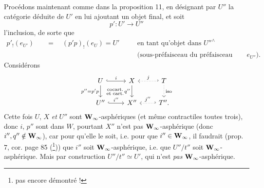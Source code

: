 Procédons maintenant comme dans la proposition 11, en désignant par $U''$ la catégorie déduite de $U'$ en lui ajoutant un objet
final, et soit
\[ p' : U' \longrightarrow U'' \]
l'inclusion, de sorte que
\[
\begin{aligned}
p'_!(e_{U'}) \quad &= \quad (p'p)_!(e_U) = U' \quad && \text{en tant qu'objet dans } U''^{\wedge}\\
& && \text{(sous-préfaisceau du préfaisceau final } e_{U''}\text{).}
\end{aligned}
\]
Considérons
\[
\begin{tikzcd}
U \arrow[r, hook, "i"] \arrow[d, "{p''=p'p}"'] \arrow[dr, phantom, "\begin{smallmatrix}\text{cocart.}\\ \text{et cart.}\end{smallmatrix}"] & X \arrow[d, "q''"'] & T \arrow[l, hook', dotted, "j"'] \arrow[d, dotted, "\text{iso}"] \\
U'' \arrow[r, hook, "i''"] & X'' & T''. \arrow[l, hook', dotted, "j''"']
\end{tikzcd}
\]
Cette fois $U$, $X$ \textit{et} $U''$ sont $\mathbf{W}_{\infty}$-asphériques (et même contractiles toutes trois), donc $i$, $p''$ sont dans $W$, pourtant $X''$ n'est pas $\mathbf{W}_{\infty}$-asphérique (donc $i'', q'' \notin \mathbf{W}_{\infty}$), car pour qu'elle le soit, i.e. pour que $i'' \in \mathbf{W}_{\infty}$, il faudrait (prop. 7, cor. page 85 (\footnote[4]{pas encore démontré !})) que $i''$ soit $\mathbf{W}_{\infty}$-asphérique, i.e. que $U''/t''$ soit $\mathbf{W}_{\infty}$-asphérique. Mais par construction $U''/t'' \simeq U'$, qui n'est \textit{pas} $\mathbf{W}_{\infty}$-asphérique.

